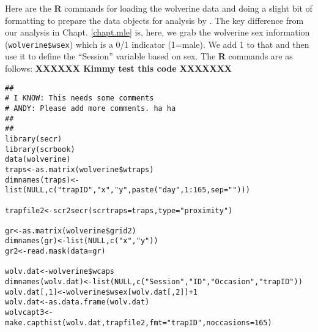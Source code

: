 Here are the {\bf R} commands for loading the wolverine data and doing
a slight bit of formatting to prepare the data objects for analysis by
\mbox{\secr}. The key difference from our analysis in
Chapt. \ref{chapt.mle} is, here, we grab the wolverine sex information
(\mbox{\tt wolverine\$wsex}) which is a 0/1 indicator (1=male). We add
1 to that and then use it to define the ``Session'' variable based on sex.
The {\bf R} commands are as follows:  {\bf XXXXXX Kimmy test this code XXXXXXX}
{\small
\begin{verbatim}
##
# I KNOW: This needs some comments
# ANDY: Please add more comments. ha ha
##
##
library(secr)
library(scrbook)
data(wolverine)
traps<-as.matrix(wolverine$wtraps)
dimnames(traps)<-list(NULL,c("trapID","x","y",paste("day",1:165,sep="")))

trapfile2<-scr2secr(scrtraps=traps,type="proximity")

gr<-as.matrix(wolverine$grid2)
dimnames(gr)<-list(NULL,c("x","y"))
gr2<-read.mask(data=gr)

wolv.dat<-wolverine$wcaps
dimnames(wolv.dat)<-list(NULL,c("Session","ID","Occasion","trapID"))
wolv.dat[,1]<-wolverine$wsex[wolv.dat[,2]]+1
wolv.dat<-as.data.frame(wolv.dat)
wolvcapt3<-make.capthist(wolv.dat,trapfile2,fmt="trapID",noccasions=165)
\end{verbatim}
}

